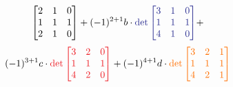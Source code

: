 \documentclass[11pt,a4paper]{article}
\begin{document}
{\[{\begin{bmatrix}
2 & 1 & 0\\
1 & 1 & 1\\
2 & 1 & 0
\end{bmatrix}} + (-1)^{2+1} b \cdot \textcolor{Blue}{\det
\begin{bmatrix}
3  & 1 & 0\\
1  & 1 & 1\\
4  & 1 & 0
\end{bmatrix}} + \]\[(-1)^{3+1} c \cdot \textcolor{Red}{\det \begin{bmatrix}
3 & 2 & 0\\
1 & 1 & 1\\
4 & 2 & 0
\end{bmatrix}} + (-1)^{4+1} d \cdot \textcolor{Laranja}{\det \begin{bmatrix}
3 & 2 & 1 \\
1 & 1 & 1 \\
4 & 2 & 1 \\
\end{bmatrix}}
\]
}
\end{document}
